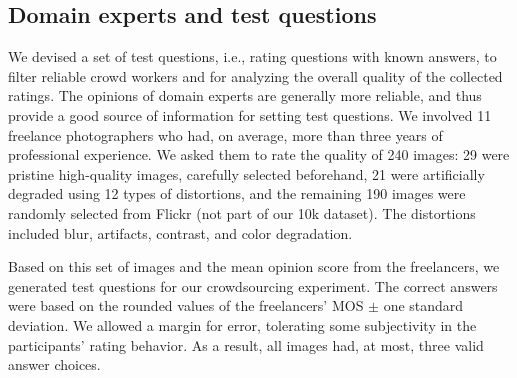 \documentclass[10pt,journal,compsoc]{IEEEtran}
\begin{document}
\subsection{Domain experts and test questions}
We devised a set of test questions, i.e., rating questions with known answers, to filter reliable crowd workers and for analyzing the overall quality of the collected ratings. The opinions of domain experts are generally more reliable, and thus provide a good source of information for setting test questions. We involved 11 freelance photographers who had, on average, more than three years of professional experience. We asked them to rate the quality of 240 images: 29 were pristine high-quality images, carefully selected beforehand, 21 were artificially degraded using 12 types of distortions, and the remaining 190 images were randomly selected from Flickr (not part of our 10k dataset). The distortions included blur, artifacts, contrast, and color degradation. 

Based on this set of images and the mean opinion score from the freelancers, we generated test questions for our crowdsourcing experiment. The correct answers were based on the rounded values of the freelancers' MOS $\pm$ one standard deviation. We allowed a margin for error, tolerating some subjectivity in the participants' rating behavior.  As a result, all images had, at most, three valid answer choices.
\end{document}
